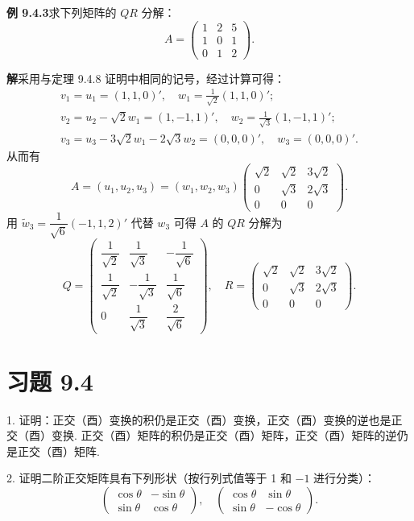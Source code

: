 \documentclass[UTF8,12pt,a4paper,fontset=fandol]{ctexart}
\begin{document}
\noindent\textbf{例 9.4.3}\quad 求下列矩阵的 $QR$ 分解：
\[
  A=
  \left(\begin{array}{ccc}
    1 & 2 & 5\\
    1 & 0 & 1\\
    0 & 1 & 2
  \end{array}\right).
\]

\noindent\textbf{解}\quad 采用与定理 9.4.8 证明中相同的记号，经过计算可得：
\[
\begin{gathered}
  v_1=u_1=(1,1,0)',\quad w_1=\frac1{\sqrt2}(1,1,0)';\\
  v_2=u_2-\sqrt2w_1=(1,-1,1)',\quad w_2=\frac1{\sqrt3}(1,-1,1)';\\
  v_3=u_3-3\sqrt2w_1-2\sqrt3w_2=(0,0,0)',\quad w_3=(0,0,0)'.
\end{gathered}
\]
从而有
\[
  A=(u_1,u_2,u_3)=(w_1,w_2,w_3)
  \left(\begin{array}{ccc}
    \sqrt2 & \sqrt2 & 3\sqrt2\\
    0 & \sqrt3 & 2\sqrt3\\
    0 & 0 & 0
  \end{array}\right).
\]
用 $\widetilde w_3=\dfrac1{\sqrt6}(-1,1,2)'$ 代替 $w_3$ 可得 $A$ 的 $QR$ 分解为
\[
  Q=
  \left(\begin{array}{ccc}
    \dfrac1{\sqrt2} & \dfrac1{\sqrt3} & -\dfrac1{\sqrt6}\\
    \dfrac1{\sqrt2} & -\dfrac1{\sqrt3} & \dfrac1{\sqrt6}\\
    0 & \dfrac1{\sqrt3} & \dfrac2{\sqrt6}
  \end{array}\right),
  \quad
  R=
  \left(\begin{array}{ccc}
    \sqrt2 & \sqrt2 & 3\sqrt2\\
    0 & \sqrt3 & 2\sqrt3\\
    0 & 0 & 0
  \end{array}\right).
\]

\section*{习题 9.4}

1. 证明：正交（酉）变换的积仍是正交（酉）变换，正交（酉）变换的逆也是正交（酉）变换. 正交（酉）矩阵的积仍是正交（酉）矩阵，正交（酉）矩阵的逆仍是正交（酉）矩阵.

2. 证明二阶正交矩阵具有下列形状（按行列式值等于 1 和 $-1$ 进行分类）：
\[
  \left(\begin{array}{cc}
    \cos\theta & -\sin\theta\\
    \sin\theta & \cos\theta
  \end{array}\right),
  \quad
  \left(\begin{array}{cc}
    \cos\theta & \sin\theta\\
    \sin\theta & -\cos\theta
  \end{array}\right).
\]
\end{document}
